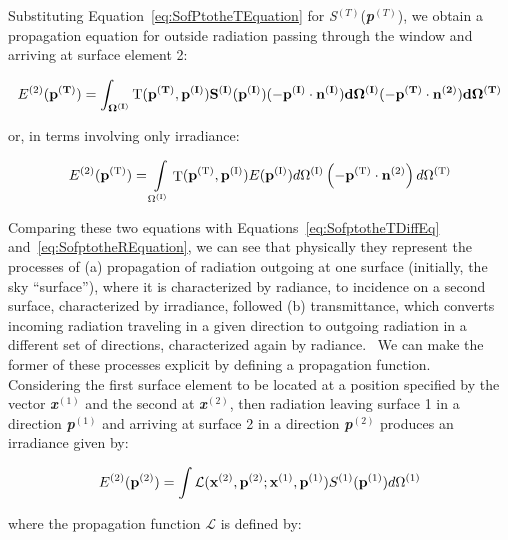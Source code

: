 Substituting Equation~\ref{eq:SofPtotheTEquation} for \emph{S}\(^{(T)}\)(\textbf{\emph{p}}\(^{(T)}\)), we obtain a propagation equation for outside radiation passing through the window and arriving at surface element 2:

\begin{equation}
E^{(2)}(\bf{p}^{(T)}) = \int_{\Omega^{(I)}} 
      \rm T (\bf{p}^{(T)},\bf{p}^{(I)}) 
      S^{(I)}(\bf{p}^{(I)})(-\bf{p}^{(I)}\cdot\bf{n}^{(I)})
      d\Omega^{(I)}(-\bf{p}^{(T)}\cdot\bf{n}^{(2)})d\Omega^{(T)}
\end{equation}

or, in terms involving only irradiance:

\begin{equation}
{E^{{\rm{(2)}}}}({{\bf{p}}^{{\rm{(T)}}}}) = \int\limits_{{\Omega ^{{\rm{(I)}}}}} {{\mathop{\rm T}\nolimits} ({{\bf{p}}^{{\rm{(T)}}}},{{\bf{p}}^{{\rm{(I)}}}})E({{\bf{p}}^{{\rm{(I)}}}})d{\Omega ^{{\rm{(I)}}}}} \left( { - {{\bf{p}}^{{\rm{(T)}}}} \cdot {{\bf{n}}^{{\rm{(2)}}}}} \right)d{\Omega ^{{\rm{(T)}}}}
\end{equation}

Comparing these two equations with Equations~\ref{eq:SofptotheTDiffEq} and~\ref{eq:SofptotheREquation}, we can see that physically they represent the processes of (a) propagation of radiation outgoing at one surface (initially, the sky ``surface''), where it is characterized by radiance, to incidence on a second surface, characterized by irradiance, followed (b) transmittance, which converts incoming radiation traveling in a given direction to outgoing radiation in a different set of directions, characterized again by radiance.~ We can make the former of these processes explicit by defining a propagation function.~ Considering the first surface element to be located at a position specified by the vector \textbf{\emph{x}}\(^{(1)}\) and the second at \textbf{\emph{x}}\(^{(2)}\), then radiation leaving surface 1 in a direction \textbf{\emph{p}}\(^{(1)}\) and arriving at surface 2 in a direction \textbf{\emph{p}}\(^{(2)}\) produces an irradiance given by:

\begin{equation}
{E^{(2)}}({{\bf{p}}^{{\rm{(2)}}}}) = \int {\mathcal{L}({{\bf{x}}^{{\rm{(2)}}}},{{\bf{p}}^{{\rm{(2)}}}};{{\bf{x}}^{{\rm{(1)}}}},{{\bf{p}}^{{\rm{(1)}}}}){S^{{\rm{(1)}}}}({{\bf{p}}^{{\rm{(1)}}}})} d{\Omega ^{{\rm{(1)}}}}
\label{eq:E2p2Equation}
\end{equation}

where the propagation function $\mathcal{L}$ is defined by:


